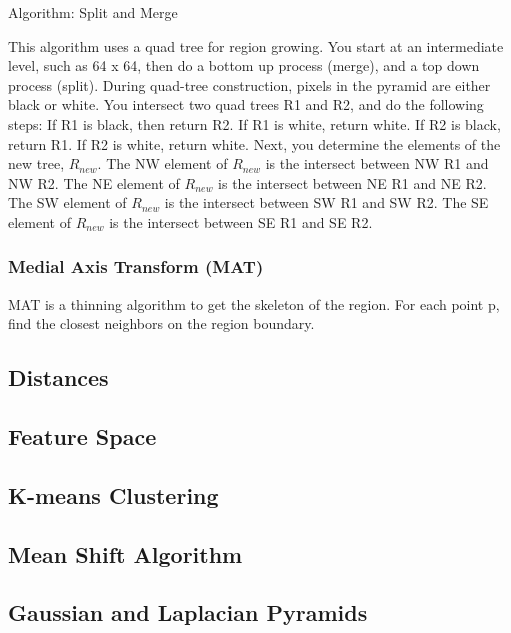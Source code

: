 \documentclass{article}
\begin{document}
\begin{multicols}{2}
  \vspace{5mm}

  Algorithm: Split and Merge

  \vspace{5mm}

  This algorithm uses a quad tree for region growing. You start at an intermediate level, such as 64 x 64, then do a bottom up process (merge), and a top down process (split).
  During quad-tree construction, pixels in the pyramid are either black or white.
  You intersect two quad trees R1 and R2, and do the following steps:
  If R1 is black, then return R2. If R1 is white, return white. If R2 is black, return R1. If R2 is white, return white.
  Next, you determine the elements of the new tree, $R_{new}$.
  The NW element of $R_{new}$ is the intersect between NW R1 and NW R2.
  The NE element of $R_{new}$ is the intersect between NE R1 and NE R2.
  The SW element of $R_{new}$ is the intersect between SW R1 and SW R2.
  The SE element of $R_{new}$ is the intersect between SE R1 and SE R2.

 \subsubsection{Medial Axis Transform (MAT)}


  MAT is a thinning algorithm to get the skeleton of the region.
  For each point p, find the closest neighbors on the region boundary.


\subsection{Distances}
\subsection{Feature Space}
\subsection{K-means Clustering}
\subsection{Mean Shift Algorithm}
\subsection{Gaussian and Laplacian Pyramids}


\end{multicols}
\end{document}
